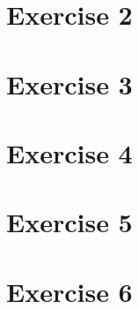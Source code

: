 \documentclass{report}
\begin{document}
\section*{Exercise 2}

\section*{Exercise 3}

\section*{Exercise 4}

\section*{Exercise 5}

\section*{Exercise 6}
\end{document}
